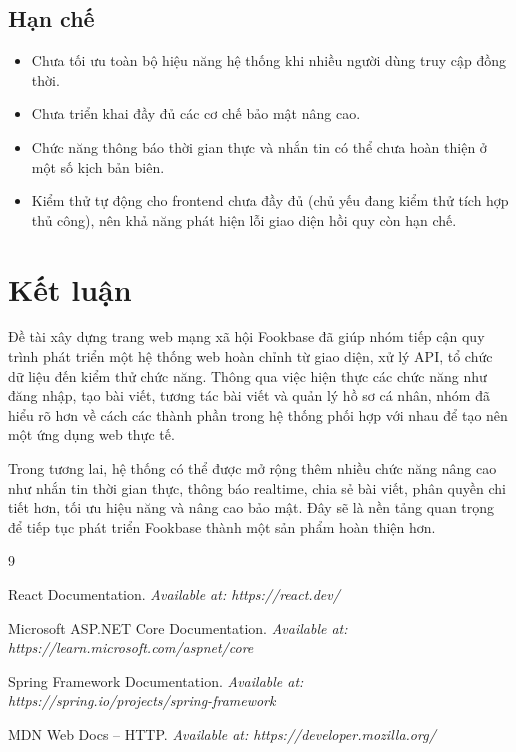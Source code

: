 \documentclass[a4paper,12pt]{article}
\begin{document}
\subsection{Hạn chế}
\begin{itemize}
    \item Chưa tối ưu toàn bộ hiệu năng hệ thống khi nhiều người dùng truy cập đồng thời.
    \item Chưa triển khai đầy đủ các cơ chế bảo mật nâng cao.
    \item Chức năng thông báo thời gian thực và nhắn tin có thể chưa hoàn thiện ở một số kịch bản biên.
    \item Kiểm thử tự động cho frontend chưa đầy đủ (chủ yếu đang kiểm thử tích hợp thủ công), nên khả năng phát hiện lỗi giao diện hồi quy còn hạn chế.
\end{itemize}

\section{Kết luận}

Đề tài xây dựng trang web mạng xã hội Fookbase đã giúp nhóm tiếp cận quy trình phát triển một hệ thống web hoàn chỉnh từ giao diện, xử lý API, tổ chức dữ liệu đến kiểm thử chức năng. Thông qua việc hiện thực các chức năng như đăng nhập, tạo bài viết, tương tác bài viết và quản lý hồ sơ cá nhân, nhóm đã hiểu rõ hơn về cách các thành phần trong hệ thống phối hợp với nhau để tạo nên một ứng dụng web thực tế.

Trong tương lai, hệ thống có thể được mở rộng thêm nhiều chức năng nâng cao như nhắn tin thời gian thực, thông báo realtime, chia sẻ bài viết, phân quyền chi tiết hơn, tối ưu hiệu năng và nâng cao bảo mật. Đây sẽ là nền tảng quan trọng để tiếp tục phát triển Fookbase thành một sản phẩm hoàn thiện hơn.

\begin{thebibliography}{9}

React Documentation. 
\textit{Available at: https://react.dev/}

Microsoft ASP.NET Core Documentation.
\textit{Available at: https://learn.microsoft.com/aspnet/core}

Spring Framework Documentation.
\textit{Available at: https://spring.io/projects/spring-framework}

MDN Web Docs -- HTTP.
\textit{Available at: https://developer.mozilla.org/}

\end{thebibliography}
\end{document}
